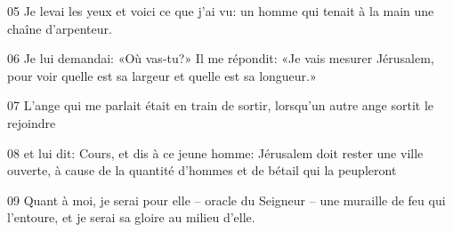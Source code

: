05 Je levai les yeux et voici ce que j’ai vu: un homme qui tenait à la main une chaîne d’arpenteur.

06 Je lui demandai: «Où vas-tu?» Il me répondit: «Je vais mesurer Jérusalem, pour voir quelle est sa largeur et quelle est sa longueur.»

07 L’ange qui me parlait était en train de sortir, lorsqu’un autre ange sortit le rejoindre

08 et lui dit: Cours, et dis à ce jeune homme: Jérusalem doit rester une ville ouverte, à cause de la quantité d’hommes et de bétail qui la peupleront

09 Quant à moi, je serai pour elle – oracle du Seigneur – une muraille de feu qui l’entoure, et je serai sa gloire au milieu d’elle.